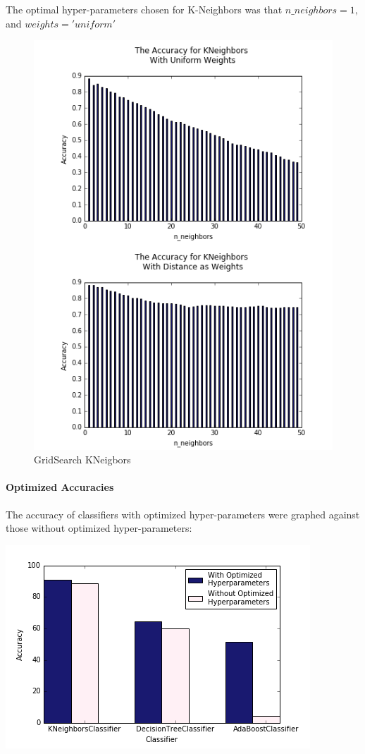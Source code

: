 \documentclass{article}
\begin{document}
The optimal hyper-parameters chosen for K-Neighbors was that $n\_neighbors = 1,$ and $weights = 'uniform'$
\begin{figure}
\includegraphics[scale=0.6]{k-nboors}
\caption{GridSearch KNeigbors}
\label{fig:knres}
\end{figure}

\paragraph{Optimized Accuracies}
The accuracy of classifiers with optimized hyper-parameters were graphed against those without optimized hyper-parameters:

\includegraphics[scale=0.7]{acc_class}
\end{document}
